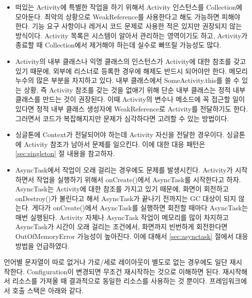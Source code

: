 \begin{itemize}
\item 떠있는 Activity에 특별한 작업을 하기 위해서 Activity 인스턴스를 Collection에 모아둔다. 최악의 상황으로 WeakReference를 사용한다고 해도 가능하면 피해야 한다. 기능 요구 사항이나 레거시 코드 문제로 사용한 적은 있지만 권장되지 않는 방식이다. Activity 목록은 시스템이 알아서 관리하는 영역이기도 하고, Activity가 종료할 때 Collection에서 제거해야 하는데 실수로 빠뜨릴 가능성도 많다.

\item Activity의 내부 클래스나 익명 클래스의 인스턴스가 Activity에 대한 참조를 갖고 있기 때문에, 외부에 리스너로 등록한 경우에 해제도 반드시 되어야만 한다. 메모리 누수의 많은 부분을 차지하고 있다. 내부 클래스에서 SomeActivity.this를 쓸 수 있는 상황, 즉 Activity 참조를 갖는 것을 없애기 위해 단순 내부 클래스는 정적 내부 클래스를 만드는 것이 권장된다.
이때 Activity의 변수나 메소드에 꼭 접근할 일이 있다면 정적 내부 클래스 생성자에 WeakReference로 Activity를 전달하기도 한다. 
그러면서 코드가 복잡해지지만 문제가 심각하다면 고려할 수 있는 방법이다. 

\item 싱글톤에 Context가 전달되어야 하는데 Activity 자신을 전달한 경우이다. 싱글톤에 Activity 참조가 남아서 문제를 일으킨다. 이에 대한 대응 패턴은 \ref{sec:singleton} 절 내용을 참고하자.

\item AsyncTask에서 작업이 오래 걸리는 경우에도 문제를 발생시킨다. Activity가 시작하면서 작업을 실행하기 위해서 onCreate()에서 AsyncTask를 시작한다고 하자. AsyncTask는 Activity에 대한 참조를 가지고 있기 때문에, 화면이 회전하고 onDestroy()가 불린다고 해서 AsyncTask가 끝나기 전까지는 GC 대상이 되지 않는다. 게다가 onCreate()에서 AsyncTask를 실행하면 회전할 때마다 AsyncTask는 매번 실행된다. Activity 자체나 AsyncTask 작업이 메모리를 많이 차지하고 AsyncTask가 시간이 오래 걸리는 조건에서, 화면까지 빈번하게 회전한다면 OutOfMemoryError 가능성이 높아진다. 이에 대해서 \ref{sec:asynctask} 절에서 대응 방법을 언급하였다.
\end{itemize}

언어별 문자열이 따로 없거나 가로/세로 레이아웃이 별도로 없는 경우에도 일단 재시작한다. Configuration이 변경되면 무조건 재시작하는 것으로 이해하면 된다. 재시작해서 리소스를 가져올 때 결과적으로 동일한 리소스를 사용하는 것 뿐이다. 프레임워크에서 호출 스택은 아래와 같다.

